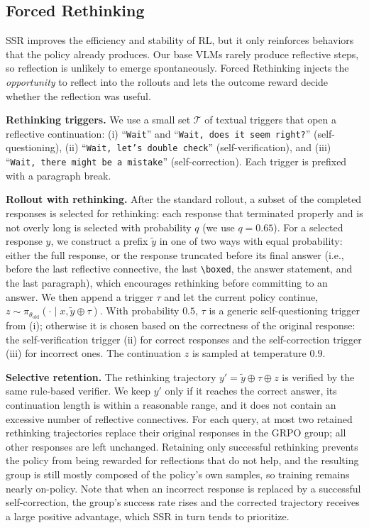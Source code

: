 \documentclass{article}
\begin{document}
\subsection{Forced Rethinking}
\label{sec:rethink}

SSR improves the efficiency and stability of RL, but it only reinforces behaviors that the policy already produces. Our base VLMs rarely produce reflective steps, so reflection is unlikely to emerge spontaneously. Forced Rethinking injects the \emph{opportunity} to reflect into the rollouts and lets the outcome reward decide whether the reflection was useful.

\textbf{Rethinking triggers.} We use a small set $\mathcal{T}$ of textual triggers that open a reflective continuation:
(i) ``\texttt{Wait}'' and ``\texttt{Wait, does it seem right?}'' (self-questioning), (ii) ``\texttt{Wait, let's double check}'' (self-verification), and (iii) ``\texttt{Wait, there might be a mistake}'' (self-correction). Each trigger is prefixed with a paragraph break.

\textbf{Rollout with rethinking.} After the standard rollout, a subset of the completed responses is selected for rethinking: each response that terminated properly and is not overly long is selected with probability $q$ (we use $q=0.65$). For a selected response $y$, we construct a prefix $\tilde{y}$ in one of two ways with equal probability: either the full response, or the response truncated before its final answer (i.e., before the last reflective connective, the last \texttt{\textbackslash boxed}, the answer statement, and the last paragraph), which encourages rethinking before committing to an answer. We then append a trigger $\tau$ and let the current policy continue, $z\sim\pi_{\theta_\text{old}}(\cdot\mid x, \tilde{y}\oplus\tau)$. With probability $0.5$, $\tau$ is a generic self-questioning trigger from (i); otherwise it is chosen based on the correctness of the original response: the self-verification trigger (ii) for correct responses and the self-correction trigger (iii) for incorrect ones. The continuation $z$ is sampled at temperature $0.9$.

\textbf{Selective retention.} The rethinking trajectory $y' = \tilde{y}\oplus\tau\oplus z$ is verified by the same rule-based verifier. We keep $y'$ only if it reaches the correct answer, its continuation length is within a reasonable range, and it does not contain an excessive number of reflective connectives. For each query, at most two retained rethinking trajectories replace their original responses in the GRPO group; all other responses are left unchanged. Retaining only successful rethinking prevents the policy from being rewarded for reflections that do not help, and the resulting group is still mostly composed of the policy's own samples, so training remains nearly on-policy. Note that when an incorrect response is replaced by a successful self-correction, the group's success rate rises and the corrected trajectory receives a large positive advantage, which SSR in turn tends to prioritize.
\end{document}
